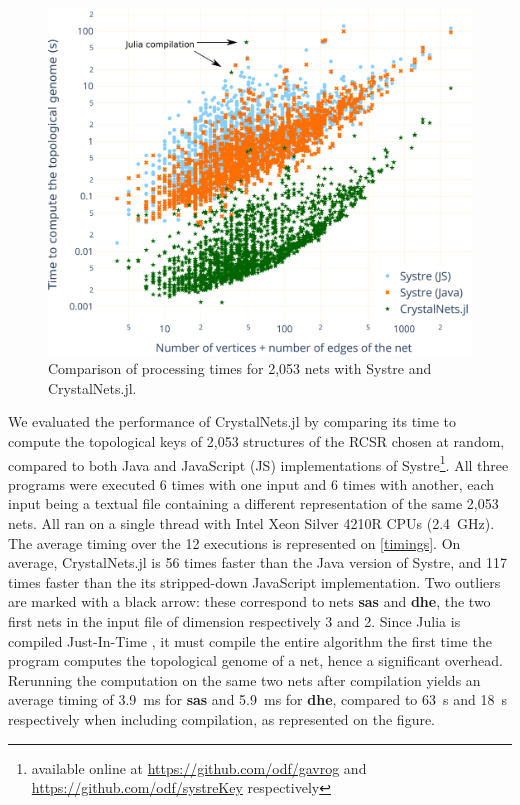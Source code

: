 \documentclass[main.tex]{subfiles}
\begin{document}
\begin{figure}[t]
	\centering
	\includegraphics[width=\linewidth]{figures/topology/timings.pdf}
	\caption{\small Comparison of processing times for 2,053 nets with Systre and CrystalNets.jl.}
	\label{timings}
\end{figure}

We evaluated the performance of CrystalNets.jl by comparing its time to compute the topological keys of 2,053 structures of the RCSR chosen at random, compared to both Java and JavaScript (JS) implementations of Systre\footnote{available online at \url{https://github.com/odf/gavrog} and \url{https://github.com/odf/systreKey} respectively}. All three programs were executed 6 times with one input and 6 times with another, each input being a textual file containing a different representation of the same 2,053 nets. All ran on a single thread with Intel Xeon Silver 4210R CPUs (2.4~GHz). The average timing over the 12 executions is represented on \autoref{timings}. On average, CrystalNets.jl is 56 times faster than the Java version of Systre, and 117 times faster than the its stripped-down JavaScript implementation. Two outliers are marked with a black arrow: these correspond to nets {\bf sas} and {\bf dhe}, the two first nets in the input file of dimension respectively 3 and 2. Since Julia is compiled Just-In-Time \autocite{JuliaDesign}, it must compile the entire algorithm the first time the program computes the topological genome of a net, hence a significant overhead. Rerunning the computation on the same two nets after compilation yields an average timing of \SI{3.9}{ms} for {\bf sas} and \SI{5.9}{ms} for {\bf dhe}, compared to \SI{63}{s} and \SI{18}{s} respectively when including compilation, as represented on the figure.
\end{document}
